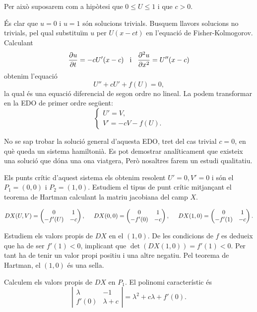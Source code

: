 \documentclass{article}
\theoremstyle{definition}
\begin{document}
Per aix\`{o} suposarem com a hip\`{o}tesi que $0\leq U\leq 1$ i que $c>0$.

\'{E}s clar que $u=0$ i $u=1$ s\'{o}n solucions trivials. Busquem llavors solucions no trivials, pel qual substitu\"{i}m $u$ per $U(x-ct)$ en l'equaci\'{o} de Fisher-Kolmogorov. Calculant
\[\frac{\partial u}{\partial t}=-cU'(x-c)\hspace{3mm}\text{i}\hspace{3mm}\frac{\partial^2u}{\partial x^2}=U''(x-c)\]
obtenim l'equaci\'{o}
\[U''+cU'+f(U)=0,\]
la qual \'{e}s una equaci\'{o} diferencial de segon ordre no lineal. La podem transformar en la EDO de primer ordre seg\"{u}ent:
\[\left\{\begin{array}{ll}U'=V,\\V'=-cV-f(U).\end{array}\right.\]

No se sap trobar la soluci\'{o} general d'aquesta EDO, tret del cas trivial $c=0$, en qu\`{e} queda un sistema hamiltoni\`{a}. Es pot demostrar anal\'{i}ticament que existeix una soluci\'{o} que d\'{o}na una ona viatgera, Per\`{o} nosaltres farem un estudi qualitatiu.

Els punts cr\'{i}tic d'aquest sistema els obtenim resolent $U'=0,V'=0$ i s\'{o}n el $P_1=(0,0)$ i $P_2=(1,0)$. Estudiem el tipus de punt cr\'{i}tic mitjan\c{c}ant el teorema de Hartman calculant la matriu jacobiana del camp $X$.

\[DX(U,V)=\left(\begin{matrix}0&1\\-f'(U)&-c\end{matrix}\right),\hspace{5mm}DX(0,0)=\left(\begin{matrix}0&1\\-f'(0)&-c\end{matrix}\right),\hspace{5mm}DX(1,0)=\left(\begin{matrix}0&1\\-f'(1)&-c\end{matrix}\right).\]

Estudiem els valors propis de $DX$ en el $(1,0)$. De les condicions de $f$ es dedueix que ha de ser $f'(1)<0$, implicant que $\det(DX(1,0))=f'(1)<0$. Per tant ha de tenir un valor propi positiu i una altre negatiu. Pel teorema de Hartman, el $(1,0)$ \'{e}s una sella.

Calculem els valors propis de $DX$ en $P_1$. El polinomi caracter\'{i}stic \'{e}s
\[\left|\begin{matrix}\lambda&-1\\f'(0)&\lambda+c\end{matrix}\right|=\lambda^2+c\lambda+f'(0).\]
\end{document}
